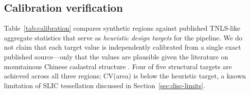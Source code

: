 \documentclass[]{interact}
\theoremstyle{plain}
\begin{document}
\subsection{Calibration verification}

Table~\ref{tab:calibration} compares synthetic regions against published TNLS-like aggregate statistics that serve as \emph{heuristic design targets} for the pipeline. We do not claim that each target value is independently calibrated from a single exact published source---only that the values are plausible given the literature on mountainous Chinese cadastral structure \citep{wu2005consolidation,tan2006fragmentation,niu2023ffi,long2018land}. Four of five structural targets are achieved across all three regions; CV(area) is below the heuristic target, a known limitation of SLIC tessellation discussed in Section~\ref{sec:disc-limits}.
\end{document}

